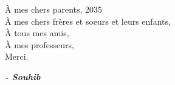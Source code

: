 
\begin{fquote}
\begin{center}
\large{

\uppercase{à} mes chers parents, 2035 \\[12pt]
\uppercase{à} mes chers frères et soeurs et leurs enfants,\\[12pt]
\uppercase{à} tous mes amis,\\[12pt]
\uppercase{à} mes professeurs,\\[12pt]
Merci.
}
\end{center}
\bigskip
\medskip
\end{fquote}

\begin{adjustwidth}{2cm}{1cm}
\hspace*{\fill} \textbf{\textit{\large{- Souhib}}}
\end{adjustwidth}

\clearpage
